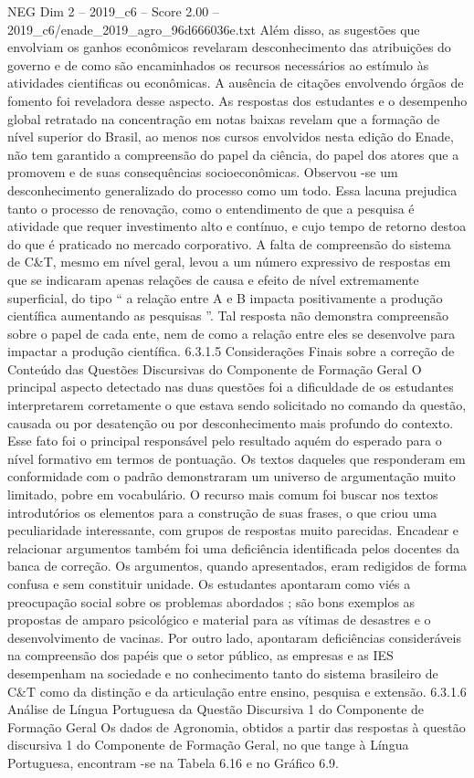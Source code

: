 \begin{textsample}{NEG Dim 2 – 2019\_c6 – Score 2.00 – 2019\_c6/enade\_2019\_agro\_96d666036e.txt}
Além disso, as sugestões que envolviam os ganhos econômicos revelaram desconhecimento das atribuições do governo e de como são encaminhados os recursos necessários ao estímulo às atividades cientificas ou econômicas.
A ausência de citações envolvendo órgãos de fomento foi reveladora desse aspecto.
As respostas dos estudantes e o desempenho global retratado na concentração em notas baixas revelam que a formação de nível superior do Brasil, ao menos nos cursos envolvidos nesta edição do Enade, não tem garantido a compreensão do papel da ciência, do papel dos atores que a promovem e de suas consequências socioeconômicas.
Observou -se um desconhecimento generalizado do processo como um todo.
Essa lacuna prejudica tanto o processo de renovação, como o entendimento de que a pesquisa é atividade que requer investimento alto e contínuo, e cujo tempo de retorno destoa do que é praticado no mercado corporativo.
A falta de compreensão do sistema de C\&T, mesmo em nível geral, levou a um número expressivo de respostas em que se indicaram apenas relações de causa e efeito de nível extremamente superficial, do tipo “ a relação entre A e B impacta positivamente a produção científica aumentando as pesquisas ”.
Tal resposta não demonstra compreensão sobre o papel de cada ente, nem de como a relação entre eles se desenvolve para impactar a produção científica. 6.3.1.5 Considerações Finais sobre a correção de Conteúdo das Questões Discursivas do Componente de Formação Geral O principal aspecto detectado nas duas questões foi a dificuldade de os estudantes interpretarem corretamente o que estava sendo solicitado no comando da questão, causada ou por desatenção ou por desconhecimento mais profundo do contexto.
Esse fato foi o principal responsável pelo resultado aquém do esperado para o nível formativo em termos de pontuação.
Os textos daqueles que responderam em conformidade com o padrão demonstraram um universo de argumentação muito limitado, pobre em vocabulário.
O recurso mais comum foi buscar nos textos introdutórios os elementos para a construção de suas frases, o que criou uma peculiaridade interessante, com grupos de respostas muito parecidas.
Encadear e relacionar argumentos também foi uma deficiência identificada pelos docentes da banca de correção.
Os argumentos, quando apresentados, eram redigidos de forma confusa e sem constituir unidade.
Os estudantes apontaram como viés a preocupação social sobre os problemas abordados ; são bons exemplos as propostas de amparo psicológico e material para as vítimas de desastres e o desenvolvimento de vacinas.
Por outro lado, apontaram deficiências consideráveis na compreensão dos papéis que o setor público, as empresas e as IES desempenham na sociedade e no conhecimento tanto do sistema brasileiro de C\&T como da distinção e da articulação entre ensino, pesquisa e extensão. 6.3.1.6 Análise de Língua Portuguesa da Questão Discursiva 1 do Componente de Formação Geral Os dados de Agronomia, obtidos a partir das respostas à questão discursiva 1 do Componente de Formação Geral, no que tange à Língua Portuguesa, encontram -se na Tabela 6.16 e no Gráfico 6.9.

\end{textsample}
